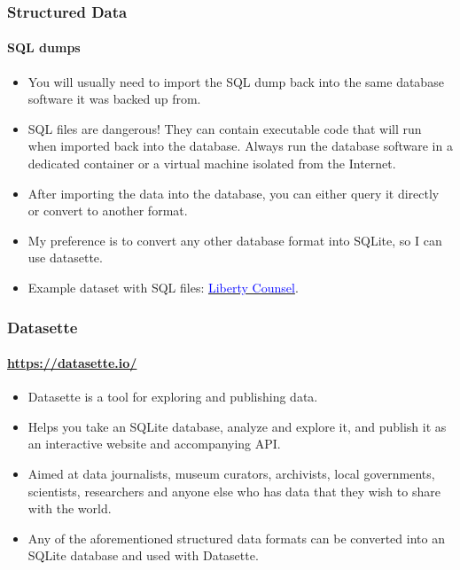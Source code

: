 \documentclass[aspectratio=169,usenames,dvipsnames]{beamer}
\begin{document}
\begin{frame}
  \frametitle{Structured Data}
  \framesubtitle{SQL dumps}

  \begin{itemize}[<+->]
    \item You will usually need to import the SQL dump back into the same
      database software it was backed up from.
    \item SQL files are dangerous! They can contain executable code that will
      run when imported back into the database. Always run the database
      software in a dedicated container or a virtual machine isolated from the
      Internet.
    \item After importing the data into the database, you can either query it
      directly or convert to another format.
    \item My preference is to convert any other database format into SQLite,
      so I can use datasette.
    \item Example dataset with SQL files:
      \href{https://ddosecrets.com/wiki/Liberty_Counsel}{\textcolor{blue}{Liberty
      Counsel}}.
  \end{itemize}

\end{frame}

\begin{frame}
  \frametitle{Datasette}
  \framesubtitle{\url{https://datasette.io/}}

  \begin{itemize}[<+->]
    \item Datasette is a tool for exploring and publishing data.
    \item Helps you take an SQLite database, analyze and explore it,
      and publish it as an interactive website and accompanying API.
    \item Aimed at data journalists, museum curators, archivists,
      local governments, scientists, researchers and anyone else who has data
      that they wish to share with the world.
    \item Any of the aforementioned structured data formats can be converted
      into an SQLite database and used with Datasette.
  \end{itemize}

\end{frame}
\end{document}
